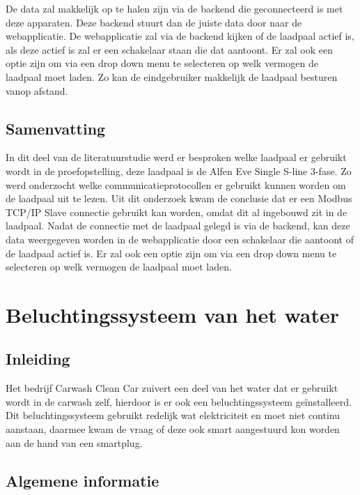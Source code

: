 De data zal makkelijk op te halen zijn via de backend die geconnecteerd is met deze apparaten. Deze backend stuurt dan de juiste data door naar de webapplicatie. De webapplicatie zal via de backend kijken of de laadpaal actief is, als deze actief is zal er een schakelaar staan die dat aantoont. Er zal ook een optie zijn om via een drop down menu te selecteren op welk vermogen de laadpaal moet laden. Zo kan de eindgebruiker makkelijk de laadpaal besturen vanop afstand.

\subsection{Samenvatting}
\label{sec:stand-van-zaken-laadpaal-samenvatting}

In dit deel van de literatuurstudie werd er besproken welke laadpaal er gebruikt wordt in de proefopstelling, deze laadpaal is de Alfen Eve Single S-line 3-fase. Zo werd onderzocht welke communicatieprotocollen er gebruikt kunnen worden om de laadpaal uit te lezen. Uit dit onderzoek kwam de conclusie dat er een Modbus TCP/IP Slave connectie gebruikt kan worden, omdat dit al ingebouwd zit in de laadpaal. Nadat de connectie met de laadpaal gelegd is via de backend, kan deze data weergegeven worden in de webapplicatie door een schakelaar die aantoont of de laadpaal actief is. Er zal ook een optie zijn om via een drop down menu te selecteren op welk vermogen de laadpaal moet laden.

\section{Beluchtingssysteem van het water}
\label{sec:stand-van-zaken-beluchtingssysteem}

\subsection{Inleiding}
\label{sec:stand-van-zaken-beluchtingssysteem-inleiding}

Het bedrijf Carwash Clean Car zuivert een deel van het water dat er gebruikt wordt in de carwash zelf, hierdoor is er ook een beluchtingssysteem geïnstalleerd. Dit beluchtingssysteem gebruikt redelijk wat elektriciteit en moet niet continu aanstaan, daarmee kwam de vraag of deze ook smart aangestuurd kon worden aan de hand van een smartplug.

\subsection{Algemene informatie}
\label{sec:stand-van-zaken-beluchtingssysteem-algemene-informatie}

